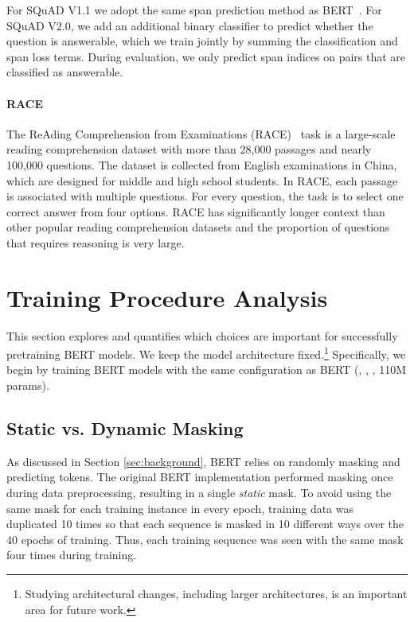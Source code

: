 \documentclass[11pt]{article}
\begin{document}
For SQuAD V1.1 we adopt the same span prediction method as BERT~\cite{devlin2018bert}.
For SQuAD V2.0, we add an additional binary classifier to predict whether the question is answerable, which we train jointly by summing the classification and span loss terms.
During evaluation, we only predict span indices on pairs that are classified as answerable.

\paragraph{RACE} \label{sec:race}
The ReAding Comprehension from Examinations (RACE)~\cite{lai2017large} task is a large-scale reading comprehension dataset with more than 28,000 passages and nearly 100,000 questions. The dataset is collected from English examinations in China, which are designed for middle and high school students. In RACE, each passage is associated with multiple questions. For every question, the task is to select one correct answer from four options. RACE has significantly longer context than other popular reading comprehension datasets and the proportion of questions
that requires reasoning is very large. \section{Training Procedure Analysis} \label{sec:design}

This section explores and quantifies which choices are important for successfully pretraining BERT models.
We keep the model architecture fixed.\footnote{Studying architectural changes, including larger architectures, is an important area for future work.} 
Specifically, we begin by training BERT models with the same configuration as BERT (,
, , 110M params).



\subsection{Static vs. Dynamic Masking} \label{sec:dynamic_masking}

As discussed in Section \ref{sec:background}, BERT relies on randomly masking and predicting tokens. 
The original BERT implementation performed masking once during data preprocessing, resulting in a single \emph{static} mask.
To avoid using the same mask for each training instance in every epoch, training data was duplicated 10 times so that each sequence is masked in 10 different ways over the 40 epochs of training.
Thus, each training sequence was seen with the same mask four times during training.
\end{document}
